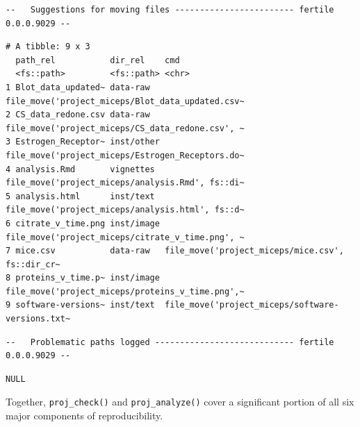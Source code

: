\documentclass[12pt,twoside]{reedthesis}
\begin{document}
\begin{verbatim}
--   Suggestions for moving files ------------------------ fertile 0.0.0.9029 --
\end{verbatim}
\begin{verbatim}
# A tibble: 9 x 3
  path_rel           dir_rel    cmd                                             
  <fs::path>         <fs::path> <chr>                                           
1 Blot_data_updated~ data-raw   file_move('project_miceps/Blot_data_updated.csv~
2 CS_data_redone.csv data-raw   file_move('project_miceps/CS_data_redone.csv', ~
3 Estrogen_Receptor~ inst/other file_move('project_miceps/Estrogen_Receptors.do~
4 analysis.Rmd       vignettes  file_move('project_miceps/analysis.Rmd', fs::di~
5 analysis.html      inst/text  file_move('project_miceps/analysis.html', fs::d~
6 citrate_v_time.png inst/image file_move('project_miceps/citrate_v_time.png', ~
7 mice.csv           data-raw   file_move('project_miceps/mice.csv', fs::dir_cr~
8 proteins_v_time.p~ inst/image file_move('project_miceps/proteins_v_time.png',~
9 software-versions~ inst/text  file_move('project_miceps/software-versions.txt~
\end{verbatim}
\begin{verbatim}
--   Problematic paths logged ---------------------------- fertile 0.0.0.9029 --
\end{verbatim}
\begin{verbatim}
NULL
\end{verbatim}
Together, \texttt{proj\_check()} and \texttt{proj\_analyze()} cover a
significant portion of all six major components of reproducibility.
\end{document}
